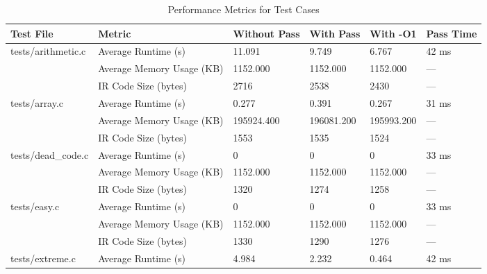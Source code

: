 \documentclass[conference]{IEEEtran}
\begin{document}
\begin{table*}[htbp]
	\centering
	\caption{Performance Metrics for Test Cases}
	\begin{tabular}{|l|l|l|l|l|l|}
		\hline
		\textbf{Test File} & \textbf{Metric}           & \textbf{Without Pass} & \textbf{With Pass} & \textbf{With -O1} & \textbf{Pass Time} \\ \hline
		tests/arithmetic.c & Average Runtime (s)       & 11.091                & 9.749              & 6.767             & 42 ms              \\
		                   & Average Memory Usage (KB) & 1152.000              & 1152.000           & 1152.000          & ---                \\
		                   & IR Code Size (bytes)      & 2716                  & 2538               & 2430              & ---                \\ \hline
		tests/array.c      & Average Runtime (s)       & 0.277                 & 0.391              & 0.267             & 31 ms              \\
		                   & Average Memory Usage (KB) & 195924.400            & 196081.200         & 195993.200        & ---                \\
		                   & IR Code Size (bytes)      & 1553                  & 1535               & 1524              & ---                \\ \hline
		tests/dead\_code.c & Average Runtime (s)       & 0                     & 0                  & 0                 & 33 ms              \\
		                   & Average Memory Usage (KB) & 1152.000              & 1152.000           & 1152.000          & ---                \\
		                   & IR Code Size (bytes)      & 1320                  & 1274               & 1258              & ---                \\ \hline
		tests/easy.c       & Average Runtime (s)       & 0                     & 0                  & 0                 & 33 ms              \\
		                   & Average Memory Usage (KB) & 1152.000              & 1152.000           & 1152.000          & ---                \\
		                   & IR Code Size (bytes)      & 1330                  & 1290               & 1276              & ---                \\ \hline
		tests/extreme.c    & Average Runtime (s)       & 4.984                 & 2.232              & 0.464             & 42 ms              \\

\end{tabular}
\end{table*}
\end{document}
